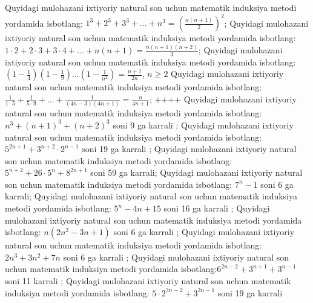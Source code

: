 Quyidagi mulohazani ixtiyoriy natural son uchun matematik induksiya metodi yordamida isbotlang: \(1^{3} + 2^{3} + 3^{3} + ... + n^{3} = \left( \frac{n(n + 1)}{2} \right)^{2}\);
Quyidagi mulohazani ixtiyoriy natural son uchun matematik induksiya metodi yordamida isbotlang: \(1 \cdot 2 + 2 \cdot 3 + 3 \cdot 4 + ... + n(n + 1) = \frac{n(n + 1)(n + 2)}{3}\);
Quyidagi mulohazani ixtiyoriy natural son uchun matematik induksiya metodi yordamida isbotlang: \(\left( 1 - \frac{1}{4} \right)\left( 1 - \frac{1}{9} \right)...\left( 1 - \frac{1}{n^{2}} \right) = \frac{n + 1}{2n}\), \(n \geq 2\)
Quyidagi mulohazani ixtiyoriy natural son uchun matematik induksiya metodi yordamida isbotlang: \(\frac{1}{1 \cdot 5} + \frac{1}{5 \cdot 9} + ... + \frac{1}{(4n - 3)(4n + 1)} = \frac{n}{4n + 1}\);
++++
Quyidagi mulohazani ixtiyoriy natural son uchun matematik induksiya metodi yordamida isbotlang: \(n^{3} + (n + 1)^{3} + (n + 2)^{3}\) soni 9 ga karrali ;
Quyidagi mulohazani ixtiyoriy natural son uchun matematik induksiya metodi yordamida isbotlang: \(5^{2n + 1} + 3^{n + 2} \cdot 2^{n - 1}\) soni 19 ga karrali ;
Quyidagi mulohazani ixtiyoriy natural son uchun matematik induksiya metodi yordamida isbotlang: \(5^{n + 2} + 26 \cdot 5^{n} + 8^{2n + 1}\) soni 59 ga karrali;
Quyidagi mulohazani ixtiyoriy natural son uchun matematik induksiya metodi yordamida isbotlang: \(7^{n} - 1\) soni 6 ga karrali;
Quyidagi mulohazani ixtiyoriy natural son uchun matematik induksiya metodi yordamida isbotlang: \(5^{n} - 4n + 15\) soni 16 ga karrali ;
Quyidagi mulohazani ixtiyoriy natural son uchun matematik induksiya metodi yordamida isbotlang: \(n\left( 2n^{2} - 3n + 1 \right)\) soni 6 ga karrali ;
Quyidagi mulohazani ixtiyoriy natural son uchun matematik induksiya metodi yordamida isbotlang: \(2n^{3} + 3n^{2} + 7n\) soni 6 ga karrali ;
Quyidagi mulohazani ixtiyoriy natural son uchun matematik induksiya metodi yordamida isbotlang:\(6^{2n - 2} + 3^{n + 1} + 3^{n - 1}\) soni 11 karrali ;
Quyidagi mulohazani ixtiyoriy natural son uchun matematik induksiya metodi yordamida isbotlang: \(5 \cdot 2^{3n - 2} + 3^{3n - 1}\) soni 19 ga karrali